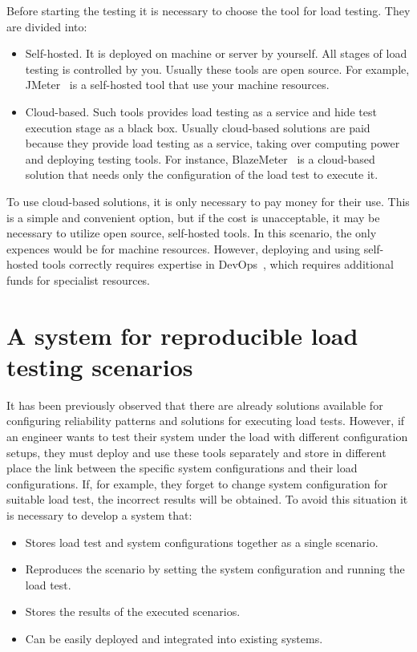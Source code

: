 Before starting the testing it is necessary to choose the tool for load testing. They are divided into:
\begin{itemize}
    \item Self-hosted. It is deployed on machine or server by yourself. All stages of load testing is controlled by you. Usually these tools are open source. For example, JMeter~\cite{jmeter} is a self-hosted tool that use your machine resources.
    \item Cloud-based. Such tools provides load testing as a service and hide test execution stage as a black box. Usually cloud-based solutions are paid because they provide load testing as a service, taking over computing power and deploying testing tools. For instance, BlazeMeter~\cite{blazemeter} is a cloud-based solution that needs only the configuration of the load test to execute it.
\end{itemize}

To use cloud-based solutions, it is only necessary to pay money for their use. This is a simple and convenient option, but if the cost is unacceptable, it may be necessary to utilize open source, self-hosted tools. In this scenario, the only expences would be for machine resources. However, deploying and using self-hosted tools correctly requires expertise in DevOps~\cite{devops}, which requires additional funds for specialist resources.


\section{A system for reproducible load testing scenarios}\label{sec:purpose}
It has been previously observed that there are already solutions available for configuring reliability patterns and solutions for executing load tests. However, if an engineer wants to test their system under the load with different configuration setups, they must deploy and use these tools separately and store in different place the link between the specific system configurations and their load configurations. If, for example, they forget to change system configuration for suitable load test, the incorrect results will be obtained. To avoid this situation it is necessary to develop a system that:
\begin{itemize}
    \item Stores load test and system configurations together as a single scenario.
    \item Reproduces the scenario by setting the system configuration and running the load test.
    \item Stores the results of the executed scenarios.
    \item Can be easily deployed and integrated into existing systems.
\end{itemize}


